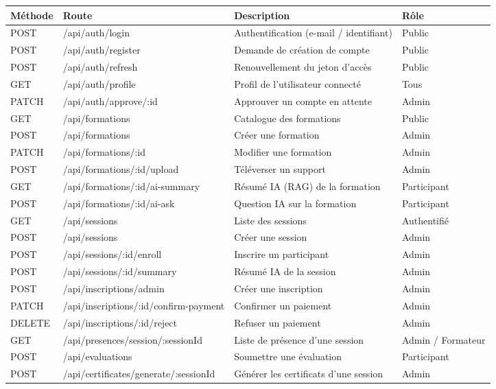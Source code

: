 \documentclass[12pt,a4paper,oneside,openany]{report}
\begin{document}
\begin{longtable}{|l|l|p{5.4cm}|p{2.2cm}|}
\hline
\textbf{Méthode} & \textbf{Route} & \textbf{Description} & \textbf{Rôle} \\
\hline
\endhead
POST & /api/auth/login & Authentification (e-mail / identifiant) & Public \\
\hline
POST & /api/auth/register & Demande de création de compte & Public \\
\hline
POST & /api/auth/refresh & Renouvellement du jeton d'accès & Public \\
\hline
GET & /api/auth/profile & Profil de l'utilisateur connecté & Tous \\
\hline
PATCH & /api/auth/approve/:id & Approuver un compte en attente & Admin \\
\hline
GET & /api/formations & Catalogue des formations & Public \\
\hline
POST & /api/formations & Créer une formation & Admin \\
\hline
PATCH & /api/formations/:id & Modifier une formation & Admin \\
\hline
POST & /api/formations/:id/upload & Téléverser un support & Admin \\
\hline
GET & /api/formations/:id/ai-summary & Résumé IA (RAG) de la formation & Participant \\
\hline
POST & /api/formations/:id/ai-ask & Question IA sur la formation & Participant \\
\hline
GET & /api/sessions & Liste des sessions & Authentifié \\
\hline
POST & /api/sessions & Créer une session & Admin \\
\hline
POST & /api/sessions/:id/enroll & Inscrire un participant & Admin \\
\hline
POST & /api/sessions/:id/summary & Résumé IA de la session & Admin \\
\hline
POST & /api/inscriptions/admin & Créer une inscription & Admin \\
\hline
PATCH & /api/inscriptions/:id/confirm-payment & Confirmer un paiement & Admin \\
\hline
DELETE & /api/inscriptions/:id/reject & Refuser un paiement & Admin \\
\hline
GET & /api/presences/session/:sessionId & Liste de présence d'une session & Admin / Formateur \\
\hline
POST & /api/evaluations & Soumettre une évaluation & Participant \\
\hline
POST & /api/certificates/generate/:sessionId & Générer les certificats d'une session & Admin \\

\end{longtable}
\end{document}
